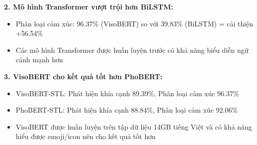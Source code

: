 \textbf{2. Mô hình Transformer vượt trội hơn BiLSTM:}
\begin{itemize}
    \item Phân loại cảm xúc: 96.37\% (VisoBERT) so với 39.83\% (BiLSTM) = cải thiện +56.54\%
    \item Các mô hình Transformer được huấn luyện trước có khả năng biểu diễn ngữ cảnh mạnh hơn
\end{itemize}

\textbf{3. VisoBERT cho kết quả tốt hơn PhoBERT:}
\begin{itemize}
    \item VisoBERT-STL: Phát hiện khía cạnh 89.39\%, Phân loại cảm xúc 96.37\%
    \item PhoBERT-STL: Phát hiện khía cạnh 88.84\%, Phân loại cảm xúc 92.06\%
    \item VisoBERT được huấn luyện trên tập dữ liệu 14GB tiếng Việt và có khả năng hiểu được emoji/icon nên cho kết quả tốt hơn
\end{itemize}








